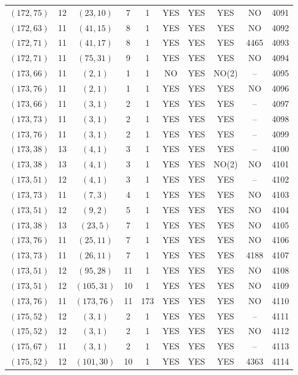 \begin{longtable}{|c|c|c|c|c|c|c|c|c|c|}
$(172, 75)$ & 12 & $(23, 10)$ & 7 & 1 & YES & YES & YES & NO & 4091\\
$(172, 63)$ & 11 & $(41, 15)$ & 8 & 1 & YES & YES & YES & NO & 4092\\
$(172, 71)$ & 11 & $(41, 17)$ & 8 & 1 & YES & YES & YES & 4465 & 4093\\
$(172, 71)$ & 11 & $(75, 31)$ & 9 & 1 & YES & YES & YES & NO & 4094\\
$(173, 66)$ & 11 & $(2, 1)$ & 1 & 1 & NO & YES & NO(2) & -- & 4095\\
$(173, 76)$ & 11 & $(2, 1)$ & 1 & 1 & YES & YES & YES & NO & 4096\\
$(173, 66)$ & 11 & $(3, 1)$ & 2 & 1 & YES & YES & YES & -- & 4097\\
$(173, 73)$ & 11 & $(3, 1)$ & 2 & 1 & YES & YES & YES & -- & 4098\\
$(173, 76)$ & 11 & $(3, 1)$ & 2 & 1 & YES & YES & YES & -- & 4099\\
$(173, 38)$ & 13 & $(4, 1)$ & 3 & 1 & YES & YES & YES & -- & 4100\\
$(173, 38)$ & 13 & $(4, 1)$ & 3 & 1 & YES & YES & NO(2) & NO & 4101\\
$(173, 51)$ & 12 & $(4, 1)$ & 3 & 1 & YES & YES & YES & -- & 4102\\
$(173, 73)$ & 11 & $(7, 3)$ & 4 & 1 & YES & YES & YES & NO & 4103\\
$(173, 51)$ & 12 & $(9, 2)$ & 5 & 1 & YES & YES & YES & NO & 4104\\
$(173, 38)$ & 13 & $(23, 5)$ & 7 & 1 & YES & YES & YES & NO & 4105\\
$(173, 76)$ & 11 & $(25, 11)$ & 7 & 1 & YES & YES & YES & NO & 4106\\
$(173, 73)$ & 11 & $(26, 11)$ & 7 & 1 & YES & YES & YES & 4188 & 4107\\
$(173, 51)$ & 12 & $(95, 28)$ & 11 & 1 & YES & YES & YES & NO & 4108\\
$(173, 51)$ & 12 & $(105, 31)$ & 10 & 1 & YES & YES & YES & NO & 4109\\
$(173, 76)$ & 11 & $(173, 76)$ & 11 & 173 & YES & YES & YES & NO & 4110\\
$(175, 52)$ & 12 & $(3, 1)$ & 2 & 1 & YES & YES & YES & -- & 4111\\
$(175, 52)$ & 12 & $(3, 1)$ & 2 & 1 & YES & YES & YES & NO & 4112\\
$(175, 67)$ & 11 & $(3, 1)$ & 2 & 1 & YES & YES & YES & -- & 4113\\
$(175, 52)$ & 12 & $(101, 30)$ & 10 & 1 & YES & YES & YES & 4363 & 4114\\

\end{longtable}
